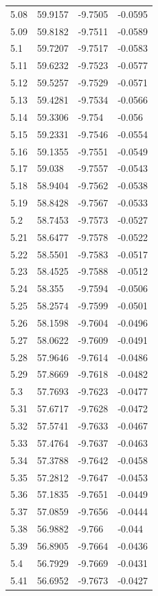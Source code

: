 \begin{tabular}{llll}
5.08 & 59.9157 & -9.7505 & -0.0595 \\
5.09 & 59.8182 & -9.7511 & -0.0589 \\
5.1 & 59.7207 & -9.7517 & -0.0583 \\
5.11 & 59.6232 & -9.7523 & -0.0577 \\
5.12 & 59.5257 & -9.7529 & -0.0571 \\
5.13 & 59.4281 & -9.7534 & -0.0566 \\
5.14 & 59.3306 & -9.754 & -0.056 \\
5.15 & 59.2331 & -9.7546 & -0.0554 \\
5.16 & 59.1355 & -9.7551 & -0.0549 \\
5.17 & 59.038 & -9.7557 & -0.0543 \\
5.18 & 58.9404 & -9.7562 & -0.0538 \\
5.19 & 58.8428 & -9.7567 & -0.0533 \\
5.2 & 58.7453 & -9.7573 & -0.0527 \\
5.21 & 58.6477 & -9.7578 & -0.0522 \\
5.22 & 58.5501 & -9.7583 & -0.0517 \\
5.23 & 58.4525 & -9.7588 & -0.0512 \\
5.24 & 58.355 & -9.7594 & -0.0506 \\
5.25 & 58.2574 & -9.7599 & -0.0501 \\
5.26 & 58.1598 & -9.7604 & -0.0496 \\
5.27 & 58.0622 & -9.7609 & -0.0491 \\
5.28 & 57.9646 & -9.7614 & -0.0486 \\
5.29 & 57.8669 & -9.7618 & -0.0482 \\
5.3 & 57.7693 & -9.7623 & -0.0477 \\
5.31 & 57.6717 & -9.7628 & -0.0472 \\
5.32 & 57.5741 & -9.7633 & -0.0467 \\
5.33 & 57.4764 & -9.7637 & -0.0463 \\
5.34 & 57.3788 & -9.7642 & -0.0458 \\
5.35 & 57.2812 & -9.7647 & -0.0453 \\
5.36 & 57.1835 & -9.7651 & -0.0449 \\
5.37 & 57.0859 & -9.7656 & -0.0444 \\
5.38 & 56.9882 & -9.766 & -0.044 \\
5.39 & 56.8905 & -9.7664 & -0.0436 \\
5.4 & 56.7929 & -9.7669 & -0.0431 \\
5.41 & 56.6952 & -9.7673 & -0.0427 \\

\end{tabular}
